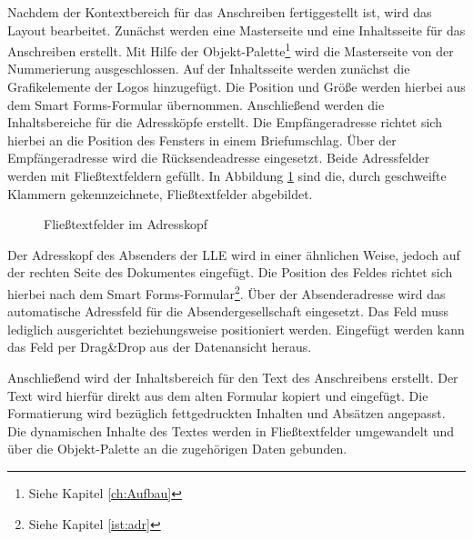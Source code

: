 Nachdem der Kontextbereich für das Anschreiben fertiggestellt ist, wird das Layout bearbeitet. Zunächst werden eine Masterseite und eine Inhaltsseite für das Anschreiben erstellt. Mit Hilfe der Objekt-Palette\footnote{Siehe Kapitel \ref{ch:Aufbau}} wird die Masterseite von der Nummerierung ausgeschlossen. Auf der Inhaltsseite werden zunächst die Grafikelemente der Logos hinzugefügt. Die Position und Größe werden hierbei aus dem Smart Forms-Formular übernommen. Anschließend werden die Inhaltsbereiche für die Adressköpfe erstellt. Die Empfängeradresse richtet sich hierbei an die Position des Fensters in einem Briefumschlag. Über der Empfängeradresse wird die Rücksendeadresse eingesetzt. Beide Adressfelder werden mit Fließtextfeldern gefüllt. In Abbildung \ref{if:adr} sind die, durch geschweifte Klammern gekennzeichnete, Fließtextfelder abgebildet.

 \begin{figure}[ht]
	\centering
	\caption{Fließtextfelder im Adresskopf}
	\label{if:adr}
\end{figure}

Der Adresskopf des Absenders der \ac{LLE} wird in einer ähnlichen Weise, jedoch auf der rechten Seite des Dokumentes eingefügt. Die Position des Feldes richtet sich hierbei nach dem Smart Forms-Formular\footnote{Siehe Kapitel \ref{ist:adr}}. Über der Absenderadresse wird das automatische Adressfeld für die Absendergesellschaft eingesetzt. Das Feld muss lediglich ausgerichtet beziehungsweise positioniert werden.  Eingefügt werden kann das Feld per Drag\&Drop aus der Datenansicht heraus.

Anschließend wird der Inhaltsbereich für den Text des Anschreibens erstellt. Der Text wird hierfür direkt aus dem alten Formular kopiert und eingefügt. Die Formatierung wird bezüglich fettgedruckten Inhalten und Absätzen angepasst. Die dynamischen Inhalte des Textes werden in Fließtextfelder umgewandelt und über die Objekt-Palette an die zugehörigen Daten gebunden.

